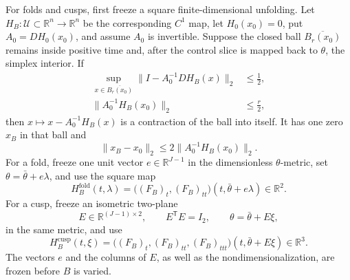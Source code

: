\documentclass[aps,physrev,onecolumn,amsmath,amssymb,longbibliography]{revtex4-2}
\begin{document}
For folds and cusps, first freeze a square finite-dimensional unfolding.  Let
\(H_B:\mathcal U\subset\mathbb R^n\to\mathbb R^n\) be the corresponding
\(C^1\) map, let \(H_0(x_0)=0\), put \(A_0=DH_0(x_0)\), and assume \(A_0\)
is invertible.  Suppose the closed ball \(\overline{B_r(x_0)}\) remains inside
positive time and, after the control slice is mapped back to \(\theta\), the
simplex interior.  If
\begin{align}
 \sup_{x\in\overline{B_r(x_0)}}
 \|I-A_0^{-1}DH_B(x)\|_2&\le\frac12,
 \label{eq:contraction-derivative}\\
 \|A_0^{-1}H_B(x_0)\|_2&\le\frac r2,
 \label{eq:contraction-residual}
\end{align}
then \(x\mapsto x-A_0^{-1}H_B(x)\) is a contraction of the ball into itself.
It has one zero \(x_B\) in that ball and
\begin{equation}
 \|x_B-x_0\|_2\le
 2\|A_0^{-1}H_B(x_0)\|_2.
 \label{eq:root-displacement}
\end{equation}
For a fold, freeze one unit vector \(e\in\mathbb R^{J-1}\) in the dimensionless
\(\theta\)-metric, set \(\theta=\bar\theta+e\lambda\), and use the square map
\begin{equation}
 H_B^{\mathrm{fold}}(t,\lambda)=
 \bigl((F_B)_t,(F_B)_{tt}\bigr)
 (t,\bar\theta+e\lambda)\in\mathbb R^2.
 \label{eq:fold-slice}
\end{equation}
For a cusp, freeze an isometric two-plane
\begin{equation}
 E\in\mathbb R^{(J-1)\times2},\qquad E^{\mathsf T}E=I_2,
 \qquad \theta=\bar\theta+E\xi,
 \label{eq:cusp-plane}
\end{equation}
in the same metric, and use
\begin{equation}
 H_B^{\mathrm{cusp}}(t,\xi)=
 \bigl((F_B)_t,(F_B)_{tt},(F_B)_{ttt}\bigr)
 (t,\bar\theta+E\xi)\in\mathbb R^3.
 \label{eq:cusp-slice}
\end{equation}
The vectors \(e\) and the columns of \(E\), as well as the
nondimensionalization, are frozen before \(B\) is varied.
\end{document}
